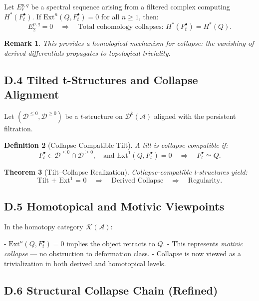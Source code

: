 \documentclass[11pt]{article}
\newtheorem{theorem}{Theorem}[section]
\newtheorem{definition}[theorem]{Definition}
\newtheorem{remark}[theorem]{Remark}
\begin{document}
\begin{lemma}
Let $E_r^{p,q}$ be a spectral sequence arising from a filtered complex computing $H^*(F^\bullet_t)$.  
If $\mathrm{Ext}^n(Q, F^\bullet_t) = 0$ for all $n \geq 1$, then:
\[
E_2^{p,q} = 0 \quad \Rightarrow \quad \text{Total cohomology collapses: } H^*(F^\bullet_t) = H^*(Q).
\]
\end{lemma}

\begin{remark}
This provides a homological mechanism for collapse: the vanishing of derived differentials propagates to topological triviality.
\end{remark}

\subsection*{D.4 Tilted t-Structures and Collapse Alignment}

Let $(\mathcal{D}^{\leq 0}, \mathcal{D}^{\geq 0})$ be a $t$-structure on $\mathcal{D}^b(\mathcal{A})$ aligned with the persistent filtration.

\begin{definition}[Collapse-Compatible Tilt]
A tilt is collapse-compatible if:
\[
F^\bullet_t \in \mathcal{D}^{\leq 0} \cap \mathcal{D}^{\geq 0},\quad \text{and } \mathrm{Ext}^1(Q, F^\bullet_t) = 0 \quad \Rightarrow \quad F^\bullet_t \simeq Q.
\]
\end{definition}

\begin{theorem}[Tilt–Collapse Realization]
Collapse-compatible t-structures yield:
\[
\text{Tilt + Ext$^1$ = 0} \quad \Rightarrow \quad \text{Derived Collapse} \quad \Rightarrow \quad \text{Regularity}.
\]
\end{theorem}

\subsection*{D.5 Homotopical and Motivic Viewpoints}

In the homotopy category $\mathcal{K}(\mathcal{A})$:

- $\mathrm{Ext}^n(Q, F^\bullet_t) = 0$ implies the object retracts to $Q$.
- This represents \emph{motivic collapse} — no obstruction to deformation class.
- Collapse is now viewed as a trivialization in both derived and homotopical levels.

\subsection*{D.6 Structural Collapse Chain (Refined)}
\end{document}
